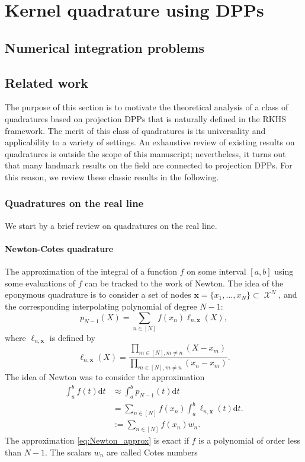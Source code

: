 \documentclass[twoside,11pt]{article}
\DeclareMathOperator{\X}{\mathcal{X}}
\begin{document}
\clearpage
\section{Kernel quadrature using DPPs}
\subsection{Numerical integration problems}

\subsection{Related work}
The purpose of this section is to motivate the theoretical analysis of a class of quadratures based on projection DPPs that is naturally defined in the RKHS framework. The merit of this class of quadratures is its universality and applicability to a variety of settings. An exhaustive review of existing results on quadratures is outside the scope of this manuscript; nevertheless, it turns out that many landmark results on the field are connected to projection DPPs. For this reason, we review these classic results in the following.







\subsubsection{Quadratures on the real line}
We start by a brief review on quadratures on the real line.
\paragraph{Newton-Cotes quadrature}
The approximation of the integral of a function $f$ on some interval $[a,b]$ using some evaluations of $f$ can be tracked to the work of Newton. The idea of the eponymous quadrature is to consider a set of nodes $\bm{x} = \{x_{1}, \dots , x_{N} \} \subset \X^{N}$, and the corresponding interpolating polynomial of degree $N-1$:
\begin{equation}
p_{N-1}(X) = \sum\limits_{n \in [N]} f(x_{n}) \ell_{n,\bm{x}}(X),
\end{equation}
where $\ell_{n,\bm{x}}$ is defined by
\begin{equation}
\ell_{n,\bm{x}}(X) = \frac{\prod\limits_{m \in [N], m \neq n }(X-x_{m})}{\prod\limits_{m \in [N], m \neq n }(x_{n}-x_{m})}.
\end{equation}
The idea of Newton was to consider the approximation
\begin{align}\label{eq:Newton_approx}
\int_{a}^{b}f(t)\mathrm{d}t & \approx \int_{a}^{b}p_{N-1}(t)\mathrm{d}t  \\
& =  \sum\limits_{n \in [N]}f(x_{n}) \int_{a}^{b} \ell_{n,\bm{x}}(t) \mathrm{d}t.\\
& :=  \sum\limits_{n \in [N]}f(x_{n}) w_{n} .
\end{align}
The approximation \eqref{eq:Newton_approx} is exact if $f$ is a polynomial of order less than $N-1$. The scalars $w_{n}$ are called Cotes numbers
\end{document}
